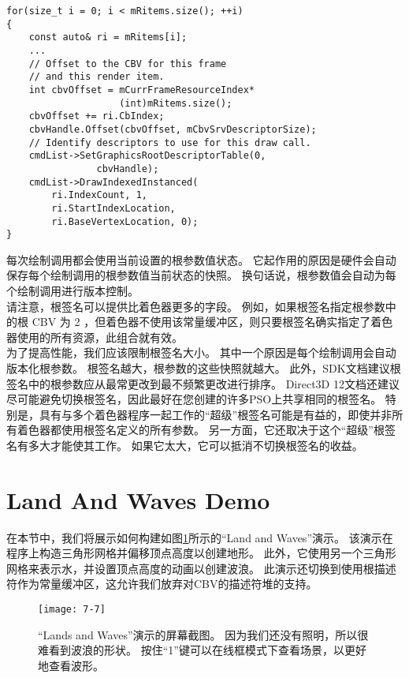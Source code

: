 \begin{lstlisting}
for(size_t i = 0; i < mRitems.size(); ++i)
{
    const auto& ri = mRitems[i];
    ...
    // Offset to the CBV for this frame 
    // and this render item.
    int cbvOffset = mCurrFrameResourceIndex*
                    (int)mRitems.size();
    cbvOffset += ri.CbIndex;
    cbvHandle.Offset(cbvOffset, mCbvSrvDescriptorSize);
    // Identify descriptors to use for this draw call.
    cmdList->SetGraphicsRootDescriptorTable(0,
                cbvHandle);
    cmdList->DrawIndexedInstanced(
        ri.IndexCount, 1,
        ri.StartIndexLocation,
        ri.BaseVertexLocation, 0);
}
\end{lstlisting}

\begin{flushleft}
每次绘制调用都会使用当前设置的根参数值状态。 它起作用的原因是硬件会自动保存每个绘制调用的根参数值当前状态的快照。 换句话说，根参数值会自动为每个绘制调用进行版本控制。\\
请注意，根签名可以提供比着色器更多的字段。 例如，如果根签名指定根参数中的根 CBV 为 2 ，但着色器不使用该常量缓冲区，则只要根签名确实指定了着色器使用的所有资源，此组合就有效。\\
为了提高性能，我们应该限制根签名大小。 其中一个原因是每个绘制调用会自动版本化根参数。 根签名越大，根参数的这些快照就越大。 此外，SDK文档建议根签名中的根参数应从最常更改到最不频繁更改进行排序。 Direct3D 12文档还建议尽可能避免切换根签名，因此最好在您创建的许多PSO上共享相同的根签名。 特别是，具有与多个着色器程序一起工作的“超级”根签名可能是有益的，即使并非所有着色器都使用根签名定义的所有参数。 另一方面，它还取决于这个“超级”根签名有多大才能使其工作。 如果它太大，它可以抵消不切换根签名的收益。
\end{flushleft}


\section{Land And Waves Demo}
\begin{flushleft}
在本节中，我们将展示如何构建如图\ref{fig:7-7}所示的“Land and Waves”演示。 该演示在程序上构造三角形网格并偏移顶点高度以创建地形。 此外，它使用另一个三角形网格来表示水，并设置顶点高度的动画以创建波浪。 此演示还切换到使用根描述符作为常量缓冲区，这允许我们放弃对CBV的描述符堆的支持。
\end{flushleft}
\begin{figure}[h]
    \texttt{[image: 7-7]}
    \centering
    \caption{“Lands and Waves”演示的屏幕截图。 因为我们还没有照明，所以很难看到波浪的形状。 按住“1”键可以在线框模式下查看场景，以更好地查看波形。}
    \label{fig:7-7}
\end{figure}

